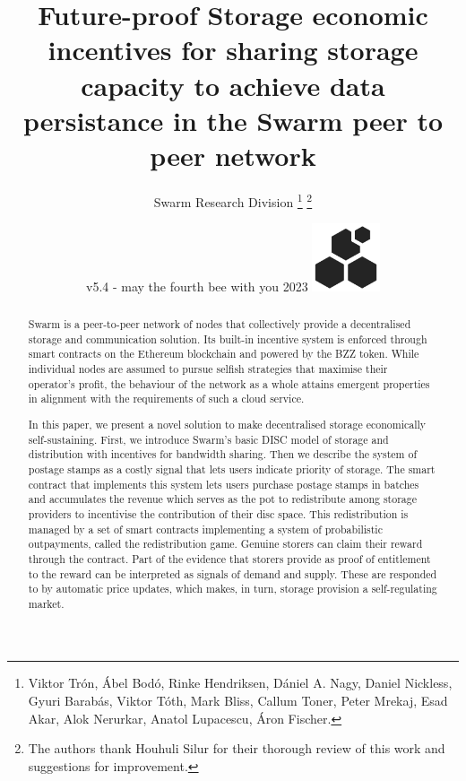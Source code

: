 
\title{\fontsize{28}\Huge\sc 
Future-proof Storage\vskip5pt
\Large economic incentives for sharing storage capacity\vskip1pt\vskip-18pt
to achieve data persistance
\vskip1pt\vskip-18pt
in the Swarm peer to peer network}
\author{Swarm Research Division%
\thanks{Viktor Trón, Ábel Bodó, Rinke Hendriksen,  Dániel A. Nagy, Daniel Nickless, Gyuri Barabás, Viktor Tóth, Mark Bliss, Callum Toner, Peter Mrekaj, Esad Akar, Alok Nerurkar, Anatol Lupacescu, Áron Fischer.}
\thanks{The authors thank Houhuli Silur for their thorough review of this work and suggestions for improvement.
}}
\date{v5.4 - may the fourth bee with you 2023
\vskip35pt\includegraphics[width=0.15\textwidth]{fig/logo.pdf}
}

\maketitle
\begin{abstract}
\noindent Swarm is a peer-to-peer network of nodes that collectively provide a decentralised storage and communication solution.  Its built-in incentive system is enforced through smart contracts on the Ethereum blockchain and powered by the BZZ token. While individual nodes are assumed to pursue selfish strategies that maximise their operator's profit, the behaviour of the network as a whole attains emergent properties in alignment with the requirements of such a cloud service.

\medskip

\noindent In this paper, we present a novel solution to make decentralised storage economically self-sustaining. First, we introduce Swarm's basic DISC model of storage and distribution with incentives for bandwidth sharing. Then we describe the system of postage stamps as a costly signal that lets users indicate priority of storage. The smart contract that implements this system lets users purchase postage stamps in batches and accumulates the revenue which serves as the pot to redistribute among storage providers to incentivise the contribution of their disc space. This redistribution is managed by  a set of smart contracts implementing a  system of probabilistic outpayments, called the redistribution game. Genuine storers can claim their reward through the  contract. Part of the evidence that storers provide as proof of entitlement to the reward can be interpreted as signals of demand and supply. These are responded to by automatic price updates, which makes, in turn, storage provision a self-regulating market.
\end{abstract}

